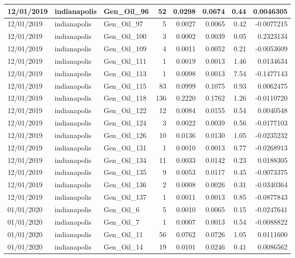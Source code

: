 \documentclass[
  letterpaper,
  DIV=11,
  numbers=noendperiod]{scrartcl}
\begin{document}
\begin{tabular}{l|l|l|r|r|r|r|r}
\hline
12/01/2019 & indianapolis & Gen\_Oil\_96 & 52 & 0.0298 & 0.0674 & 0.44 & 0.0046305\\
\hline
12/01/2019 & indianapolis & Gen\_Oil\_97 & 5 & 0.0027 & 0.0065 & 0.42 & -0.0077215\\
\hline
12/01/2019 & indianapolis & Gen\_Oil\_100 & 3 & 0.0002 & 0.0039 & 0.05 & 0.2323134\\
\hline
12/01/2019 & indianapolis & Gen\_Oil\_109 & 4 & 0.0011 & 0.0052 & 0.21 & -0.0053609\\
\hline
12/01/2019 & indianapolis & Gen\_Oil\_111 & 1 & 0.0019 & 0.0013 & 1.46 & 0.0134634\\
\hline
12/01/2019 & indianapolis & Gen\_Oil\_113 & 1 & 0.0098 & 0.0013 & 7.54 & -0.1477143\\
\hline
12/01/2019 & indianapolis & Gen\_Oil\_115 & 83 & 0.0999 & 0.1075 & 0.93 & 0.0062475\\
\hline
12/01/2019 & indianapolis & Gen\_Oil\_118 & 136 & 0.2220 & 0.1762 & 1.26 & -0.0110720\\
\hline
12/01/2019 & indianapolis & Gen\_Oil\_122 & 12 & 0.0084 & 0.0155 & 0.54 & 0.0040548\\
\hline
12/01/2019 & indianapolis & Gen\_Oil\_124 & 3 & 0.0022 & 0.0039 & 0.56 & -0.0177103\\
\hline
12/01/2019 & indianapolis & Gen\_Oil\_126 & 10 & 0.0136 & 0.0130 & 1.05 & -0.0235232\\
\hline
12/01/2019 & indianapolis & Gen\_Oil\_131 & 1 & 0.0010 & 0.0013 & 0.77 & -0.0268913\\
\hline
12/01/2019 & indianapolis & Gen\_Oil\_134 & 11 & 0.0033 & 0.0142 & 0.23 & 0.0188305\\
\hline
12/01/2019 & indianapolis & Gen\_Oil\_135 & 9 & 0.0053 & 0.0117 & 0.45 & -0.0073375\\
\hline
12/01/2019 & indianapolis & Gen\_Oil\_136 & 2 & 0.0008 & 0.0026 & 0.31 & -0.0340364\\
\hline
12/01/2019 & indianapolis & Gen\_Oil\_137 & 1 & 0.0011 & 0.0013 & 0.85 & -0.0877843\\
\hline
01/01/2020 & indianapolis & Gen\_Oil\_6 & 5 & 0.0010 & 0.0065 & 0.15 & -0.0247641\\
\hline
01/01/2020 & indianapolis & Gen\_Oil\_7 & 1 & 0.0007 & 0.0013 & 0.54 & -0.0088822\\
\hline
01/01/2020 & indianapolis & Gen\_Oil\_11 & 56 & 0.0762 & 0.0726 & 1.05 & 0.0111600\\
\hline
01/01/2020 & indianapolis & Gen\_Oil\_14 & 19 & 0.0101 & 0.0246 & 0.41 & 0.0086562\\

\end{tabular}
\end{document}
